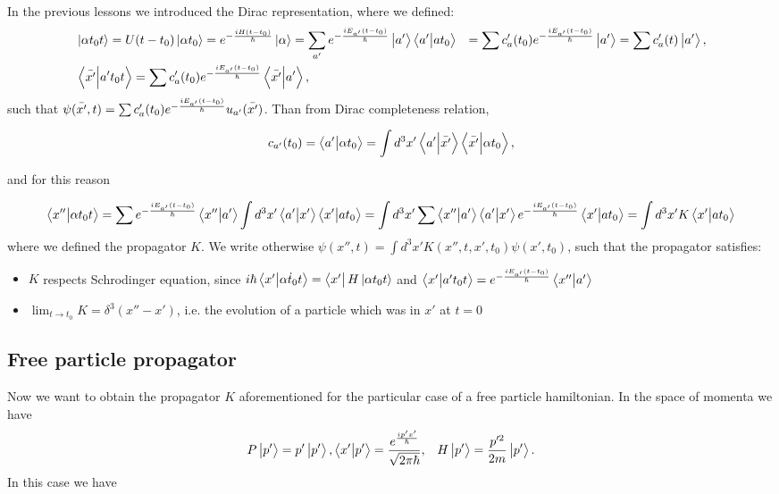 \documentclass[main.tex]{subfiles}
\begin{document}
In the previous lessons we introduced the Dirac representation, where we defined:
\begin{align}
    &\ket{\alpha t_0 t}=U(t-t_0)\ket{\alpha t_0}=e^{-\frac{iH(t-t_0)}{\hbar}}\ket{\alpha}=\sum_{a'} e^{-\frac{iE_{a'}(t-t_0)}{\hbar}}\ket{a'}\braket{a'}{a t_0}
    &=\sum c_a'(t_0)e^{-\frac{iE_{a'}(t-t_0)}{\hbar}}\ket{a'}=\sum c'_a(t)\ket{a'},\\
    &\braket{\Bar{x'}}{a't_0 t}=\sum c_a'(t_0)e^{-\frac{iE_{a'}(t-t_0)}{\hbar}}\braket{\Bar{x'}}{a'},
\end{align}
such that $\psi(\Bar{x'},t)=\sum c_a'(t_0)e^{-\frac{iE_{a'}(t-t_0)}{\hbar}}u_{a'}(\Bar{x'})$.
Than from Dirac completeness relation,

\begin{align}
c_{a'}(t_0)=\braket{a'}{\alpha t_0}=\int d^3x' \braket{a'}{\Bar{x'}}\braket{\Bar{x'}}{\alpha t_0},
\end{align}

and for this reason

\begin{align}
\braket{x''}{\alpha t_0 t}=\sum e^{-\frac{iE_{a'}(t-t_0)}{\hbar}}\braket{x''}{a'}\int d^3x'\braket{a'}{x'}\braket{x'}{a t_0}
=\int d^3x'\sum \braket{x''}{a'} \braket{a'}{x'}e^{-\frac{iE_{a'}(t-t_0)}{\hbar}}\braket{x'}{a t_0}=\int d^3x' K \braket{x'}{a t_0}
\end{align}
where we defined the propagator $K$. We write otherwise $\psi(x'',t)=\int d^3x' K(x'', t, x', t_0)\psi(x', t_0)$, such that the propagator satisfies:

\begin{itemize}
    \item $K$ respects Schrodinger equation, since $i\hbar\braket{x'}{\Dot{\alpha t_0 t}}=\bra{x'}H\ket{\alpha t_0 t}$ and $\braket{x'}{a' t_0 t}=e^{-\frac{iE_{a'}(t-t_0)}{\hbar}}\braket{x''}{a'}$
    \item $\lim_{t\to t_0}K=\delta^3(x''-x')$, i.e. the evolution of a particle which was in $x'$ at $t=0$
\end{itemize}
\subsection{Free particle propagator}
Now we want to obtain the propagator $K$ aforementioned for the particular case of a free particle hamiltonian. In the space of momenta we have
\begin{align}
&P\ket{p'}=p'\ket{p'}, \braket{x'}{p'}=\frac{e^{\frac{ip'x'}{\hbar}}}{\sqrt{2\pi\hbar}},
&H\ket{p'}=\frac{p'^2}{2m}\ket{p'}.
\end{align}
In this case we have
\end{document}
